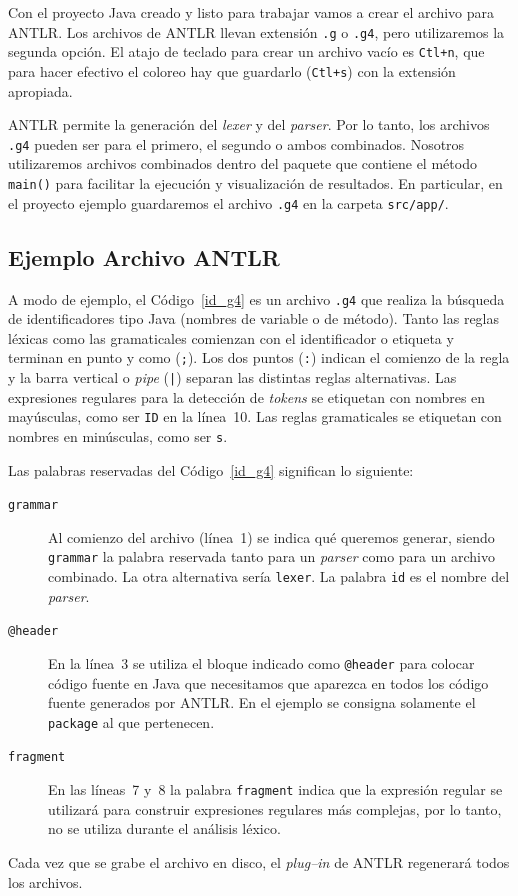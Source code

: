 \documentclass[a5paper,10pt]{article}
\begin{document}
Con el proyecto Java creado y listo para trabajar vamos a crear el archivo para ANTLR. Los archivos de ANTLR llevan extensión \verb|.g| o \verb|.g4|, pero utilizaremos la segunda opción.  El atajo de teclado para crear un archivo vacío es \verb|Ctl+n|, que para hacer efectivo el coloreo hay que guardarlo (\verb|Ctl+s|) con la extensión apropiada.

ANTLR permite la generación del \emph{lexer} y del \emph{parser}.  Por lo tanto, los archivos \verb|.g4| pueden ser para el primero, el segundo o ambos combinados.  Nosotros utilizaremos archivos combinados dentro del paquete que contiene el método \verb|main()| para facilitar la ejecución y visualización de resultados.  En particular, en el proyecto ejemplo guardaremos el archivo \verb|.g4| en la carpeta \verb|src/app/|.


\subsection{Ejemplo Archivo ANTLR}
\label{ejemplo_archivo_antlr}



A modo de ejemplo, el Código~\ref{id_g4} es un archivo \verb|.g4| que realiza la búsqueda de identificadores tipo Java (nombres de variable o de método).  Tanto las reglas léxicas como las gramaticales comienzan con el identificador o etiqueta y terminan en punto y como (\verb|;|).  Los dos puntos (\verb|:|) indican el comienzo de la regla y la barra vertical o \emph{pipe} (\verb-|-) separan las distintas reglas alternativas.  Las expresiones regulares para la detección de \emph{tokens} se etiquetan con nombres en mayúsculas, como ser \verb|ID| en la línea~10.  Las reglas gramaticales se etiquetan con nombres en minúsculas, como ser \verb|s|.

Las palabras reservadas del Código~\ref{id_g4} significan lo siguiente:
\begin{description}
	\item[\texttt{grammar}] Al comienzo del archivo (línea~1) se indica qué queremos generar, siendo \verb|grammar| la palabra reservada tanto para un \emph{parser} como para un archivo combinado. La otra alternativa sería \verb|lexer|.  La palabra \verb|id| es el nombre del \emph{parser}.
	\item[\texttt{@header}] En la línea~3 se utiliza el bloque indicado como \verb|@header| para colocar código fuente en Java que necesitamos que aparezca en todos los código fuente generados por ANTLR.  En el ejemplo se consigna solamente el \verb|package| al que pertenecen.
	\item[\texttt{fragment}] En las líneas~7 y~8 la palabra \verb|fragment| indica que la expresión regular se utilizará para construir expresiones regulares más complejas, por lo tanto, no se utiliza durante el análisis léxico.
\end{description}

Cada vez que se grabe el archivo en disco, el \emph{plug--in} de ANTLR regenerará todos los archivos.
\end{document}
